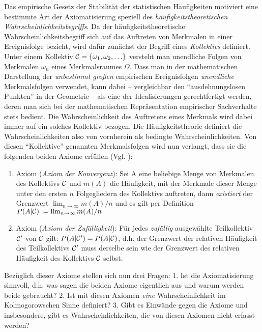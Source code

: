 Das empirische Gesetz der Stabilität der statistischen Häufigkeiten motiviert
eine bestimmte Art der Axiomatisierung speziell des {\em
häufigkeitstheoretischen Wahrscheinlichkeitsbegriffs}. Da der
häufigkeitstheoretische Wahrscheinlichkeitsbegriff sich auf das Auftreten von
Merkmalen in einer Ereignisfolge bezieht, wird dafür zunächst der Begriff eines
{\em Kollektivs} definiert. Unter einem Kollektiv ${\cal C} =
\{\omega_1,\omega_2,\ldots\}$ versteht man unendliche Folgen von Merkmalen
$\omega_n$ eines Merkmalsraumes $\Omega$. Dass man in der mathematischen
Darstellung der {\em unbestimmt großen} empirischen Ereignisfolgen {\em
unendliche} Merkmalsfolgen verwendet, kann dabei -- vergleichbar den
"`ausdehnungslosen Punkten"' in der Geometrie -- als eine der Idealisierungen
gerechtfertigt werden, deren man sich bei der mathematischen Repräsentation
empirischer Sachverhalte stets bedient. Die Wahrscheinlichkeit des Auftretens
eines Merkmals wird dabei immer auf ein solches Kollektiv bezogen. Die
Häufigkeitstheorie definiert die Wahrscheinlichkeiten also von vornherein als
bedingte Wahrscheinlichkeiten. Von diesen "`Kollektive"' genannten
Merkmalsfolgen wird nun verlangt, dass sie die folgenden beiden Axiome erfüllen 
(Vgl. \cite[S.97, 105]{gillies:2000}):

\begin{enumerate}
  \item Axiom ({\em Axiom der Konvergenz}): Sei A eine beliebige Menge
  von Merkmalen des Kollektivs ${\cal C}$ und $m(A)$ die Häufigkeit, mit der
  Merkmale dieser Menge unter den ersten $n$ Folgegliedern des Kollektivs
  auftreten, dann {\em existiert} der Grenzwert $\lim_{n\to\infty} m(A)/n$ und
  es gilt per Definition $P(A|{\cal C}) := \lim_{n\to\infty} m(A)/n$
  \item Axiom ({\em Axiom der Zufälligkeit}): Für jedes {\em zufällig}
  ausgewählte Teilkollektiv ${\cal C'}$ von ${\cal C}$ gilt: 
  $ P(A|{\cal C'}) = P(A|{\cal C}) $, d.h. der Grenzwert der relativen
  Häufigkeit des Teilkollektivs ${\cal C'}$ muss derselbe sein wie der Grenzwert des relativen
  Häufigkeit des Kollektivs ${\cal C}$ selbst.
\end{enumerate}

Bezüglich dieser Axiome stellen sich nun drei Fragen: 1. Ist die
Axiomatisierung sinnvoll, d.h. was sagen die beiden Axiome eigentlich aus und
warum werden beide gebraucht? 2. Ist mit diesen Axiomen {\em eine}
Wahrscheinlichkeit im Kolmogorowschen Sinne definiert? 3. Gibt es Einwände
gegen die Axiome und insbesondere, gibt es Wahrscheinlichkeiten, die von diesen
Axiomen nicht erfasst werden?

